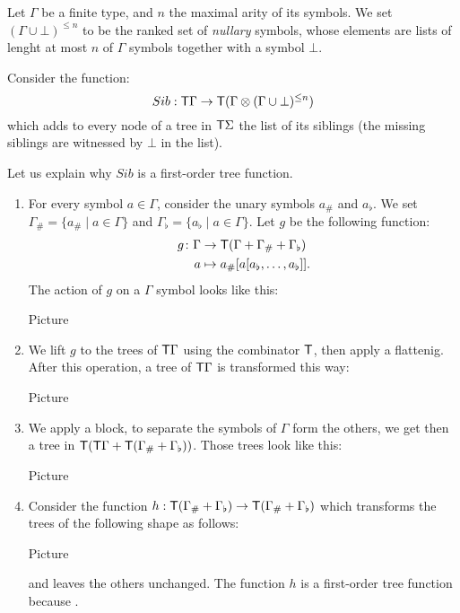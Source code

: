 \bigskip
\noindent \begin{example}
Let $\Gamma$ be a finite type, and $n$ the maximal arity of its symbols. We set $(\Gamma\cup\bot)^{\leq n}$ to be the ranked set of \emph{nullary} symbols, whose elements are lists of lenght at most $n$ of $\Gamma$ symbols together with a symbol $\bot$.

\medskip
Consider the function:
$$ Sib: \mathsf T \Gamma \to \mathsf T (\Gamma\otimes (\Gamma\cup\bot)^{\leq n})$$
which adds to every node of a tree in $\mathsf T \Sigma$ the list of its siblings (the missing siblings are witnessed by $\bot$ in the list).

Let us explain why $Sib$ is a first-order tree function. 
\begin{enumerate}
\item For every symbol $a\in \Gamma$, consider the unary symbols $a_\#$ and $a_\flat$.
We set $\Gamma_\#=\{a_\#\mid a\in\Gamma\}$ and $\Gamma_\flat=\{a_\flat\mid a\in\Gamma\}$.
Let $g$ be the following function:
 \begin{align*}
  g\colon \Gamma &\to \mathsf T(\Gamma+\Gamma_\#+\Gamma_\flat)\\
  a &\mapsto a_\#[a[a_\flat,\dots,a_\flat]].
\end{align*}
The action of $g$ on a $\Gamma$ symbol looks like this:
\begin{center}
Picture
\end{center}
\item We lift $g$ to the trees of $\mathsf T \Gamma$ using the combinator $\mathsf T$, then apply a flattenig. After this operation, a tree of $\mathsf T\Gamma$ is transformed this way:
\begin{center}
Picture
\end{center}
\item We apply a block, to separate the symbols of $\Gamma$ form the others, we get then a tree in $\mathsf T(\mathsf T\Gamma+\mathsf T(\Gamma_\#+\Gamma_\flat))$. Those trees look like this:
\begin{center}
Picture
\end{center}
\item Consider the function $h:\mathsf T(\Gamma_\#+\Gamma_\flat)\to \mathsf T(\Gamma_\#+\Gamma_\flat)$ which transforms the trees of the following shape as follows:
\begin{center}
Picture
\end{center}
and leaves the others unchanged. 
The function $h$ is a first-order tree function because .


\end{enumerate}
\end{example}
